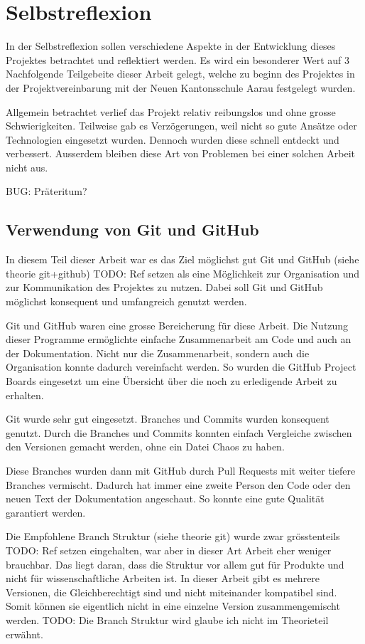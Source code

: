 \section{Selbstreflexion}
In der Selbstreflexion sollen verschiedene Aspekte in der Entwicklung dieses
Projektes betrachtet und reflektiert werden. Es wird ein besonderer Wert auf 3
Nachfolgende Teilgebeite dieser Arbeit gelegt, welche zu beginn des Projektes in
der Projektvereinbarung mit der Neuen Kantonsschule Aarau festgelegt wurden.

Allgemein betrachtet verlief das Projekt relativ reibungslos und ohne grosse
Schwierigkeiten. Teilweise gab es Verzögerungen, weil nicht so gute Ansätze oder
Technologien eingesetzt wurden. Dennoch wurden diese schnell entdeckt und
verbessert. Ausserdem bleiben diese Art von Problemen bei einer solchen Arbeit
nicht aus.

BUG: Präteritum?

\subsection*{Verwendung von Git und GitHub}
In diesem Teil dieser Arbeit war es das Ziel möglichst gut Git und GitHub (siehe
theorie git+github)  TODO: Ref setzen
als eine Möglichkeit zur Organisation und zur Kommunikation des Projektes zu
nutzen. Dabei soll Git und GitHub möglichst konsequent und umfangreich genutzt
werden.

Git und GitHub waren eine grosse Bereicherung für diese Arbeit. Die
Nutzung dieser Programme ermöglichte einfache Zusammenarbeit am Code und auch an
der Dokumentation. Nicht nur die Zusammenarbeit, sondern auch die Organisation
konnte dadurch vereinfacht werden. So wurden die GitHub Project Boards
eingesetzt um eine Übersicht über die noch zu erledigende Arbeit zu erhalten.

Git wurde sehr gut eingesetzt. Branches und Commits wurden konsequent genutzt.
Durch die Branches und Commits konnten einfach Vergleiche zwischen den Versionen
gemacht werden, ohne ein Datei Chaos zu haben.

Diese Branches wurden dann mit GitHub durch Pull Requests mit weiter tiefere
Branches vermischt. Dadurch hat immer eine zweite Person den Code oder den neuen
Text der Dokumentation angeschaut. So konnte eine gute Qualität garantiert
werden.

Die Empfohlene Branch Struktur (siehe theorie git) wurde zwar grösstenteils  TODO: Ref setzen
eingehalten, war aber in dieser Art Arbeit eher weniger brauchbar. Das liegt
daran, dass die Struktur vor allem gut für Produkte und nicht für
wissenschaftliche Arbeiten ist. In dieser Arbeit gibt es mehrere Versionen, die
Gleichberechtigt sind und nicht miteinander kompatibel sind. Somit können sie
eigentlich nicht in eine einzelne Version zusammengemischt werden.
TODO: Die Branch Struktur wird glaube ich nicht im Theorieteil erwähnt.


